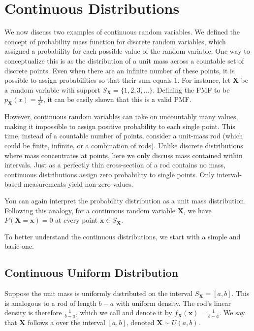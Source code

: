 \section{Continuous Distributions}

We now discuss two examples of continuous random variables.
We defined the concept of probability mass function for discrete random variables,
which assigned a probability for each possible value of the random variable.
One way to conceptualize this is as the distribution of a unit mass across a countable set of discrete points.
Even when there are an infinite number of these points,
it is possible to assign probabilities so that their sum equals 1.
For instance, let \( \bm{X} \) be a random variable with support \( S_{\bm{X}} = \{ 1, 2, 3, \ldots \} \).
Defining the PMF to be \( p_{\bm{X}}(x) = \frac{1}{2^x} \),
it can be easily shown that this is a valid PMF.

However, continuous random variables can take on uncountably many values,
making it impossible to assign positive probability to each single point.
This time, instead of a countable number of points, consider a unit-mass rod (which could be finite, infinite, or a combination of rods). 
Unlike discrete distributions where mass concentrates at points, here we only discuss mass contained within intervals.
Just as a perfectly thin cross-section of a rod contains no mass, continuous distributions assign zero probability to single points.
Only interval-based measurements yield non-zero values.

You can again interpret the probability distribution as a unit mass distribution.
Following this analogy, for a continuous random variable \( \bm{X} \),
we have \( P(\bm{X} = \bm{x}) = 0 \) at every point \( \bm{x} \in S_{\bm{X}} \).

To better understand the continuous distributions, we start with a simple and basic one.

\subsection{Continuous Uniform Distribution}

Suppose the unit mass is uniformly distributed on the interval \( S_{\bm{X}} = [a, b] \).
This is analogous to a rod of length \( b - a \) with uniform density.
The rod's linear density is therefore \( \frac{1}{b - a} \),
which we call  and denote it by \( f_{\bm{X}}(\bm{x}) = \frac{1}{b - a} \).
We say that \( \bm{X} \) follows a  over the interval \( [a, b] \), denoted \( \bm{X} \sim U(a, b) \).

